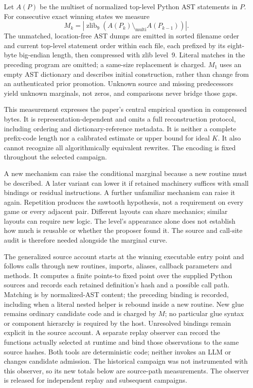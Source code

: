 \documentclass[11pt]{article}
\theoremstyle{definition}
\theoremstyle{remark}
\begin{document}
Let $A(P)$ be the multiset of normalized top-level Python AST statements in $P$.
For consecutive exact winning states we measure
\begin{equation}
 M_k=\left|\operatorname{zlib}_9\!\left(
 A(P_k)\setminus_{\mathrm{multi}}A(P_{k-1})\right)\right|.
 \label{eq:conditional-ast}
\end{equation}
The unmatched, location-free AST dumps are emitted in sorted filename order and
current top-level statement order within each file, each prefixed by its eight-byte
big-endian length, then compressed with zlib level~9. Literal matches in the
preceding program are omitted; a same-size replacement is charged. $M_1$ uses an
empty AST dictionary and describes initial construction, rather than change from
an authenticated prior promotion. Unknown source and missing predecessors yield
unknown marginals, not zeros, and comparisons never bridge those gaps.

This measurement expresses the paper's central empirical question in compressed
bytes. It is representation-dependent and omits a full reconstruction protocol,
including ordering and dictionary-reference metadata. It is neither a complete
prefix-code length nor a calibrated estimate or upper bound for ideal $K$.
It also cannot recognize all algorithmically equivalent rewrites. The encoding
is fixed throughout the selected campaign.

A new mechanism can raise the conditional marginal because a new routine must be
described. A later variant can lower it if retained machinery suffices with small
bindings or residual instructions. A further unfamiliar mechanism can raise it
again. Repetition produces the sawtooth hypothesis, not a requirement on every
game or every adjacent pair. Different layouts can share mechanics; similar
layouts can require new logic. The level's appearance alone does not establish
how much is reusable or whether the proposer found it. The source and call-site
audit is therefore needed alongside the marginal curve.

The generalized source account starts at the winning executable entry point and
follows calls through new routines, imports, aliases, callback parameters and
methods. It computes a finite points-to fixed point over the supplied Python
sources and records each retained definition's hash and a possible call path.
Matching is by normalized-AST content; the preceding binding is recorded, including
when a literal nested helper is rebound inside a new routine. New glue
remains ordinary candidate code and is charged by $M$; no particular glue syntax
or component hierarchy is required by the host. Unresolved bindings remain explicit
in the source account. A separate replay observer can record the functions actually
selected at runtime and bind those observations to the same source hashes. Both
tools are deterministic code; neither invokes an LLM or changes candidate admission.
The historical campaign was not instrumented with this observer, so its new totals
below are source-path measurements. The observer is released for independent replay
and subsequent campaigns.
\end{document}
